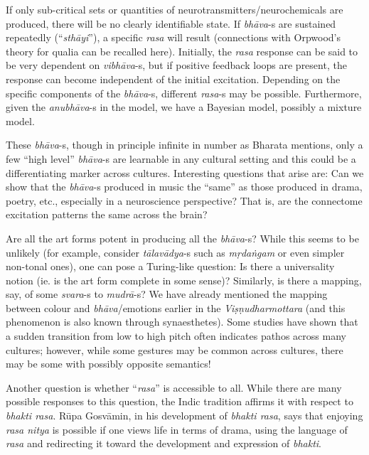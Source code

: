 If only sub-critical sets or quantities of neurotransmitters/neuro\-chemicals are produced, there will be no clearly identifiable state. If \textsl{bhāva}-s are sustained repeatedly (“\textsl{sthāyi}”), a specific \textsl{rasa} will result (connections with Orpwood’s theory for qualia can be recalled here). Initially, the \textsl{rasa} response can be said to be very dependent on \textsl{vibhāva}-s, but if positive feedback loops are present, the response can become independent of the initial excitation. Depending on the specific components of the \textsl{bhāva}-s, different \textsl{rasa}-s may be possible. Furthermore, given the \textsl{anubhāva}-s in the model, we have a Bayesian model, possibly a mixture model.

These \textsl{bhāva}-s, though in principle infinite in number as Bharata mentions, only a few “high level” \textsl{bhāva}-s are learnable in any cultural setting and this could be a differentiating marker across cultures. Interesting questions that arise are: Can we show that the \textsl{bhāva}-s produced in music the “same” as those produced in drama, poetry, etc., especially in a neuroscience perspective? That is, are the connectome excitation patterns the same across the brain?

Are all the art forms potent in producing all the \textsl{bhāva}-s? While this seems to be unlikely (for example, consider \textsl{tālavādya}-s such as \textsl{mṛdaṅgam} or even simpler non-tonal ones), one can pose a Turing-like question: Is there a universality notion (ie. is the art form complete in some sense)? Similarly, is there a mapping, say, of some \textsl{svara}-s to \textsl{mudrā}-s? We have already mentioned the mapping between colour and \textsl{bhāva}/emotions earlier in the \textsl{Viṣṇudharmottara} (and this phenomenon is also known through synaesthetes). Some studies have shown that a sudden transition from low to high pitch often indicates pathos across many cultures; however, while some gestures may be common across cultures, there may be some with possibly opposite semantics!

Another question is whether “\textsl{rasa}” is accessible to all. While there are many possible responses to this question, the Indic tradition affirms it with respect to \textsl{bhakti rasa}. Rūpa Gosvāmin, in his development of \textsl{bhakti rasa}, says that enjoying \textsl{rasa nitya} is possible if one views life in terms of drama, using the language of \textsl{rasa} and redirecting it toward the development and expression of \textsl{bhakti}.

